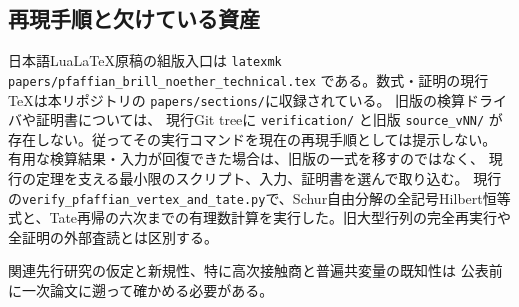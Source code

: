 \subsection{再現手順と欠けている資産}
日本語LuaLaTeX原稿の組版入口は
\nolinkurl{latexmk papers/pfaffian_brill_noether_technical.tex}
である。数式・証明の現行TeXは本リポジトリの
\texttt{papers/sections/}に収録されている。
旧版の検算ドライバや証明書については、
現行Git treeに \texttt{verification/} と旧版 \texttt{source\_vNN/}
が存在しない。従ってその実行コマンドを現在の再現手順としては提示しない。
有用な検算結果・入力が回復できた場合は、旧版の一式を移すのではなく、
現行の定理を支える最小限のスクリプト、入力、証明書を選んで取り込む。
現行の\texttt{verify\_pfaffian\_vertex\_and\_tate.py}で、Schur自由分解の全記号Hilbert恒等式と、Tate再帰の六次までの有理数計算を実行した。旧大型行列の完全再実行や全証明の外部査読とは区別する。

関連先行研究の仮定と新規性、特に高次接触商と普遍共変量の既知性は
公表前に一次論文に遡って確かめる必要がある。
